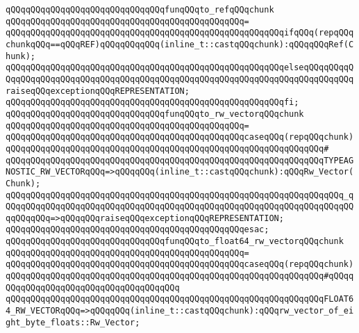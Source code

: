 \newline
\verb|qQQqqQQqqQQqqQQqqQQqqQQqqQQqqQQqfunqQQqto_refqQQqchunk|\newline
\verb|qQQqqQQqqQQqqQQqqQQqqQQqqQQqqQQqqQQqqQQqqQQqqQQq=|\newline
\verb|qQQqqQQqqQQqqQQqqQQqqQQqqQQqqQQqqQQqqQQqqQQqqQQqqQQqqQQqifqQQq(repqQQqchunkqQQq==qQQqREF)qQQqqQQqqQQq(inline_t::castqQQqchunk):qQQqqQQqRef(Chunk);|\newline
\verb|qQQqqQQqqQQqqQQqqQQqqQQqqQQqqQQqqQQqqQQqqQQqqQQqqQQqqQQqelseqQQqqQQqqQQqqQQqqQQqqQQqqQQqqQQqqQQqqQQqqQQqqQQqqQQqqQQqqQQqqQQqqQQqqQQqqQQqqQQqraiseqQQqexceptionqQQqREPRESENTATION;|\newline
\verb|qQQqqQQqqQQqqQQqqQQqqQQqqQQqqQQqqQQqqQQqqQQqqQQqqQQqqQQqfi;|\newline
\newline
\verb|qQQqqQQqqQQqqQQqqQQqqQQqqQQqqQQqfunqQQqto_rw_vectorqQQqchunk|\newline
\verb|qQQqqQQqqQQqqQQqqQQqqQQqqQQqqQQqqQQqqQQqqQQqqQQq=|\newline
\verb|qQQqqQQqqQQqqQQqqQQqqQQqqQQqqQQqqQQqqQQqqQQqqQQqcaseqQQq(repqQQqchunk)|\newline
\verb|qQQqqQQqqQQqqQQqqQQqqQQqqQQqqQQqqQQqqQQqqQQqqQQqqQQqqQQqqQQqqQQq#|\newline
\verb|qQQqqQQqqQQqqQQqqQQqqQQqqQQqqQQqqQQqqQQqqQQqqQQqqQQqqQQqqQQqqQQqTYPEAGNOSTIC_RW_VECTORqQQq=>qQQqqQQq(inline_t::castqQQqchunk):qQQqRw_Vector(Chunk);|\newline
\verb|qQQqqQQqqQQqqQQqqQQqqQQqqQQqqQQqqQQqqQQqqQQqqQQqqQQqqQQqqQQqqQQqqQQq_qQQqqQQqqQQqqQQqqQQqqQQqqQQqqQQqqQQqqQQqqQQqqQQqqQQqqQQqqQQqqQQqqQQqqQQqqQQqqQQq=>qQQqqQQqraiseqQQqexceptionqQQqREPRESENTATION;|\newline
\verb|qQQqqQQqqQQqqQQqqQQqqQQqqQQqqQQqqQQqqQQqqQQqqQQqesac;|\newline
\newline
\verb|qQQqqQQqqQQqqQQqqQQqqQQqqQQqqQQqfunqQQqto_float64_rw_vectorqQQqchunk|\newline
\verb|qQQqqQQqqQQqqQQqqQQqqQQqqQQqqQQqqQQqqQQqqQQqqQQq=|\newline
\verb|qQQqqQQqqQQqqQQqqQQqqQQqqQQqqQQqqQQqqQQqqQQqqQQqcaseqQQq(repqQQqchunk)|\newline
\verb|qQQqqQQqqQQqqQQqqQQqqQQqqQQqqQQqqQQqqQQqqQQqqQQqqQQqqQQqqQQqqQQq#qQQqqQQqqQQqqQQqqQQqqQQqqQQqqQQqqQQqqQQq|\newline
\verb|qQQqqQQqqQQqqQQqqQQqqQQqqQQqqQQqqQQqqQQqqQQqqQQqqQQqqQQqqQQqqQQqFLOAT64_RW_VECTORqQQq=>qQQqqQQq(inline_t::castqQQqchunk):qQQqrw_vector_of_eight_byte_floats::Rw_Vector;|\newline

